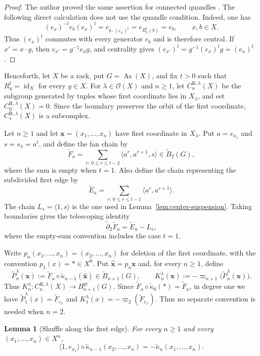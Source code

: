 \documentclass[10pt,a4paper]{amsart}
\newtheorem{lemma}[theorem]{Lemma}
\DeclareMathOperator{\As}{As}
\newcommand{\OO}{\mathcal O}
\newcommand{\tB}{\widetilde B}
\newcommand{\tkap}{\widetilde\kappa}
\newcommand{\tF}{\widetilde F}
\newcommand{\tE}{\widetilde E}
\newcommand{\tP}{\widetilde P}
\newcommand{\td}{\widetilde\partial}
\newcommand{\gr}{\mathrm{gr}}
\newcommand{\R}{\mathrm R}
\begin{document}
\begin{proof}
The author proved the same assertion for connected quandles \cite[Lemma~3.5]{NosakaAdjoint}. The following direct calculation does not use the quandle condition. Indeed, %
one has 
\[ (e_x)^{-t}e_b(e_x)^t=e_{b\cdot(e_x)^t}=e_{R_x^t(b)}=e_b, \qquad x,b \in X .\]
Thus $(e_x)^t$ commutes with every generator $e_b$ and is therefore central. If $x'=x\cdot g$, then $e_{x'}=g^{-1}e_xg$, and centrality gives $(e_{x'})^t=g^{-1}(e_x)^tg=(e_x)^t$.
\end{proof}

Henceforth, let $X$ be a rack, put $G=\As(X)$, and fix $t>0$ such that
$R_y^t=\operatorname{id}_X$ for every $y\in X$. For
$\lambda\in\OO(X)$ and $n\ge1$, let $C_n^{\R,\lambda}(X)$ be the
subgroup generated by tuples whose first coordinate lies in $X_\lambda$,
and set $C_0^{\R,\lambda}(X)=0$. Since the boundary preserves the orbit of
the first coordinate, $C_*^{\R,\lambda}(X)$ is a subcomplex.

Let $n\ge1$ and let $\mathbf x=(x_1,\ldots,x_n)$ have first coordinate in $X_\lambda$. Put $a=e_{x_1}$ and $s=s_\lambda=a^t$, and define the fan chain by
\[
        \tF_a=
        \sum_{r:\,0\le r\le t-2}\langle a^r,a^{r+1},s\rangle
        \in \tB_2(G),
\]
where the sum is empty when $t=1$. Also define the chain representing the subdivided first edge by
\[
        \tE_a=\sum_{r:\,0\le r\le t-1}\langle a^r,a^{r+1}\rangle.
\]
The chain $L_s=\langle1,s\rangle$ is the one used in
Lemma~\ref{lem:center-suspension}. Taking boundaries gives the telescoping
identity
\begin{equation}
        \td_2\tF_a=\tE_a-L_s,
        \label{eq:fan-boundary}
\end{equation}
where the empty-sum convention includes the case $t=1$.

Write $p_n(x_1,\ldots,x_n)=(x_2,\ldots,x_n)$ for deletion of the first coordinate, with the convention $p_1(x)=*\in X^0$. Put $\widehat{\mathbf x}=p_n\mathbf x$ and, for every $n\ge1$, define
\[
 \tP_n^\lambda(\mathbf x)
 :=\tF_a\diamond\tkap_{n-1}(\widehat{\mathbf x})\in\tB_{n+1}(G),
 \qquad
 K_n^\lambda(\mathbf x):=-\varpi_{n+1}\bigl(\tP_n^\lambda(\mathbf x)\bigr).
\]
Thus $K_n^\lambda\colon C_n^{\R,\lambda}(X)\to B_{n+1}^{\gr}(G)$. Since $\tF_a\diamond\tkap_0(*)=\tF_a$, in degree one we have $\tP_1^\lambda(x)=\tF_{e_x}$ and $K_1^\lambda(x)=-\varpi_2(\tF_{e_x})$. Thus no separate convention is needed when $n=2$.

\begin{lemma}[Shuffle along the first edge]
\label{lem:first-edge-shuffle}
For every $n\ge1$ and every $(x_1,\ldots,x_n)\in X^n$,
\[
\langle1,e_{x_1}\rangle\diamond
 \tkap_{n-1}(x_2,\ldots,x_n)
 =-\tkap_n(x_1,\ldots,x_n).
\]
\end{lemma}
\end{document}
